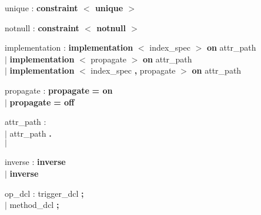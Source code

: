 \begin{tabbing}
\grindent
unique \> : {\bf constraint $<$ unique $>$}
\end{tabbing}

\begin{tabbing}
\grindent
notnull \> : {\bf constraint $<$ notnull $>$}
\end{tabbing}

\begin{tabbing}
\grindent
implementation \> : {\bf implementation} {\bf $<$} index\_spec {\bf $>$} {\bf on} attr\_path\\
\>$|$ {\bf implementation} {\bf $<$} propagate {\bf $>$} {\bf on} attr\_path\\
\>$|$ {\bf implementation} {\bf $<$} index\_spec {\bf, }propagate {\bf $>$} {\bf on} attr\_path
\end{tabbing}

\begin{tabbing}
\grindent
propagate \> : {\bf propagate} {\bf = on}\\
\>$|$ {\bf propagate} {\bf = off}
\end{tabbing}

\begin{tabbing}
\grindent
attr\_path \> : \ident\\
\> $|$ attr\_path {\bf .} \ident\\
\> $|$ \ident {\bf ::} \ident
\end{tabbing}

\begin{tabbing}
\grindent
inverse \> : {\bf inverse} \ident {\bf ::} \ident\\
\> $|$ {\bf inverse} \ident
\end{tabbing}

\begin{tabbing}
\grindent
op\_dcl \> : trigger\_dcl {\bf ;}\\
\> $|$ method\_dcl {\bf ;}
\end{tabbing}

